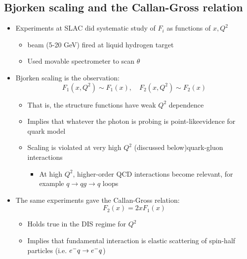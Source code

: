 \subsection{Bjorken scaling and the Callan-Gross relation}
\begin{itemize}
  \item Experiments at SLAC did systematic study of $F_i$ as functions of $x,Q^2$
  \begin{itemize}
    \item \el beam (5-20 GeV) fired at liquid hydrogen target
    \item Used movable \el spectrometer to scan $\theta$
  \end{itemize}
  \item Bjorken scaling is the observation:
  \begin{equation}
    F_1(x,Q^2) \sim F_1(x),\quad F_2(x,Q^2)\sim F_2(x)
  \end{equation}
  \begin{itemize}
    \item That is, the structure functions have weak $Q^2$ dependence
    \item Implies that whatever the photon is probing is point-like\thus evidence for quark model
    \item Scaling is violated at very high $Q^2$ (discussed below)\thus quark-gluon interactions
    \begin{itemize}
      \item At high $Q^2$, higher-order QCD interactions become relevant, for example $q\rightarrow qg \rightarrow q$ loops
    \end{itemize}
  \end{itemize}
  \item The same experiments gave the Callan-Gross relation:
  \begin{equation}
    F_2(x) = 2xF_1(x)
  \end{equation}
  \begin{itemize}
    \item Holds true in the DIS regime for $Q^2$
    \item Implies that fundamental interaction is elastic scattering of spin-half particles (i.e. $e^{-} q\rightarrow e^{-} q$)
  \end{itemize}
\end{itemize}

